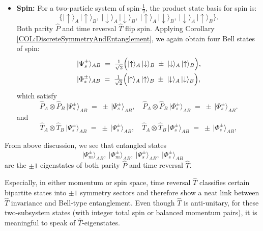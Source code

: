 \documentclass[12pt,a4paper]{article}
\begin{document}
\begin{itemize}
	\item \textbf{Spin:}	
	For a two-particle system of spin-$\frac{1}{2}$, the product state basis for spin is:
	$$
	\{
	\lvert \uparrow   \rangle_A\,\lvert \uparrow   \rangle_B, ~
	\lvert \downarrow \rangle_A\,\lvert \downarrow \rangle_B, ~
	\lvert \uparrow   \rangle_A\,\lvert \downarrow \rangle_B, ~
	\lvert \downarrow \rangle_A\,\lvert \uparrow   \rangle_B
	\}.
	$$
	Both parity $\hat{P}$ and time reversal $\hat{T}$ flip spin.
	Applying Corollary \ref{COL:DiscreteSymmetryAndEntanglement}, we again obtain four Bell states of spin:
	\begin{align}\label{SpinBellStates}
		\begin{aligned}
			&\lvert \Psi_s^{\pm} \rangle_{AB}
			\;=\;
			\tfrac{1}{\sqrt{2}}
			\Bigl(
			\lvert \uparrow\rangle_A \,\lvert \downarrow\rangle_B
			\;\pm\;
			\lvert \downarrow\rangle_A \,\lvert \uparrow\rangle_B
			\Bigr), \\
			&\lvert \Phi_s^{\pm} \rangle_{AB}
			\;=\;
			\tfrac{1}{\sqrt{2}}
			\Bigl(
			\lvert \uparrow \rangle_A \,\lvert \uparrow \rangle_B
			\;\pm\;
			\lvert \downarrow \rangle_A \,\lvert \downarrow \rangle_B
			\Bigr),
		\end{aligned}
	\end{align}
	which satisfy	
	\[
	\hat{P}_A \otimes \hat{P}_B \,\lvert \Psi_s^{\pm} \rangle_{AB} \;=\; \pm\,\lvert \Psi_s^{\pm} \rangle_{AB},
	\quad
	\hat{P}_A \otimes \hat{P}_B \,\lvert \Phi_s^{\pm} \rangle_{AB} \;=\; \pm\,\lvert \Phi_s^{\pm} \rangle_{AB}.
	\]
	and
	\[
	\hat{T}_A \otimes \hat{T}_B\,\lvert \Psi_s^{\pm} \rangle_{AB} \;=\; \pm\,\lvert \Psi_s^{\pm} \rangle_{AB},
	\quad
	\hat{T}_A \otimes \hat{T}_B\,\lvert \Phi_s^{\pm} \rangle_{AB} \;=\; \pm\,\lvert \Phi_s^{\pm} \rangle_{AB},
	\]
\end{itemize}


From above discussion, we see that entangled states
\[
\lvert \Psi_m^{\pm} \rangle_{AB},~
\lvert \Phi_m^{\pm} \rangle_{AB},~
\lvert \Psi_s^{\pm} \rangle_{AB},~
\lvert \Phi_s^{\pm} \rangle_{AB}
\]
are the $\pm1$ eigenstates of both parity $\hat{P}$ and time reversal $\hat{T}$.


Especially, in either momentum or spin space, time reversal $\hat{T}$ classifies certain bipartite states into $\pm1$ symmetry sectors and therefore show a neat link between $\hat{T}$ invariance and Bell-type entanglement.
Even though $\hat{T}$ is anti‑unitary, for these two-subsystem states (with integer total spin or balanced momentum pairs), it is meaningful to speak of $\hat{T}$-eigenstates.
\end{document}

